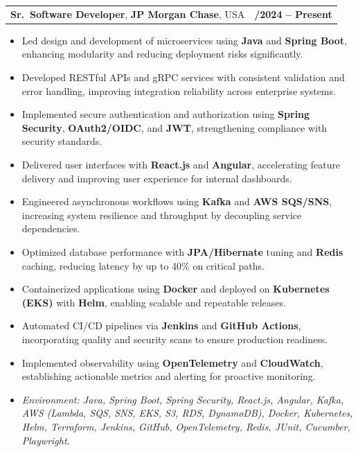 \documentclass[letterpaper,11pt]{article}
\makeatletter
\newcommand{\resumeItem}[1]{
  \item\footnotesize{
    {#1 \vspace{-2pt}}
  }
}
\newcommand{\resumeSubheading}[4]{
  \vspace{-2pt}\item
    \begin{tabular*}{1.0\textwidth}[t]{l@{\extracolsep{\fill}}r}
      \textbf{\fontsize{10pt}{14pt}\selectfont #3}, \textbf{\fontsize{10pt}{14pt}\selectfont #1}, \fontsize{10pt}{14pt}\selectfont #4 & \textbf{\fontsize{10pt}{14pt}\selectfont #2} \\
    \end{tabular*}\vspace{-7pt}
}
\newcommand{\resumeItemListStart}{\begin{itemize}[leftmargin=*]}
\newcommand{\resumeItemListEnd}{\end{itemize}\vspace{-5pt}}
\makeatother
\begin{document}
\resumeSubheading
{JP Morgan Chase}{09/2024 -- Present}
{Sr.\ Software Developer}{USA}
\resumeItemListStart
  \resumeItem{Led design and development of microservices using \textbf{Java} and \textbf{Spring Boot}, enhancing modularity and reducing deployment risks significantly.}
  \resumeItem{Developed RESTful APIs and gRPC services with consistent validation and error handling, improving integration reliability across enterprise systems.}
  \resumeItem{Implemented secure authentication and authorization using \textbf{Spring Security}, \textbf{OAuth2/OIDC}, and \textbf{JWT}, strengthening compliance with security standards.}
  \resumeItem{Delivered user interfaces with \textbf{React.js} and \textbf{Angular}, accelerating feature delivery and improving user experience for internal dashboards.}
  \resumeItem{Engineered asynchronous workflows using \textbf{Kafka} and \textbf{AWS SQS/SNS}, increasing system resilience and throughput by decoupling service dependencies.}
  \resumeItem{Optimized database performance with \textbf{JPA/Hibernate} tuning and \textbf{Redis} caching, reducing latency by up to 40\% on critical paths.}
  \resumeItem{Containerized applications using \textbf{Docker} and deployed on \textbf{Kubernetes (EKS)} with \textbf{Helm}, enabling scalable and repeatable releases.}
  \resumeItem{Automated CI/CD pipelines via \textbf{Jenkins} and \textbf{GitHub Actions}, incorporating quality and security scans to ensure production readiness.}
  \resumeItem{Implemented observability using \textbf{OpenTelemetry} and \textbf{CloudWatch}, establishing actionable metrics and alerting for proactive monitoring.}
  \resumeItem{\textit{Environment: Java, Spring Boot, Spring Security, React.js, Angular, Kafka, AWS (Lambda, SQS, SNS, EKS, S3, RDS, DynamoDB), Docker, Kubernetes, Helm, Terraform, Jenkins, GitHub, OpenTelemetry, Redis, JUnit, Cucumber, Playwright.}}
\resumeItemListEnd
\end{document}
